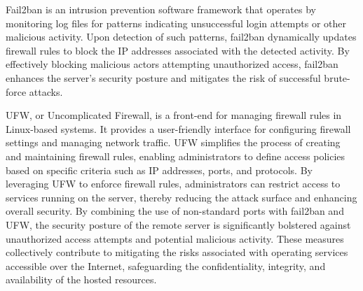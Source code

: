 \documentclass[12pt]{article} %
\begin{document}
\newline
\newline
\noindent Fail2ban is an intrusion prevention software framework that operates by monitoring log files for patterns indicating unsuccessful login attempts or other malicious activity. Upon detection of such patterns, fail2ban dynamically updates firewall rules to block the IP addresses associated with the detected activity. By effectively blocking malicious actors attempting unauthorized access, fail2ban enhances the server's security posture and mitigates the risk of successful brute-force attacks.
\newline
\newline

\pagebreak
\noindent UFW, or Uncomplicated Firewall, is a front-end for managing firewall rules in Linux-based systems. It provides a user-friendly interface for configuring firewall settings and managing network traffic. UFW simplifies the process of creating and maintaining firewall rules, enabling administrators to define access policies based on specific criteria such as IP addresses, ports, and protocols. By leveraging UFW to enforce firewall rules, administrators can restrict access to services running on the server, thereby reducing the attack surface and enhancing overall security.
\newline
\newline
\noindent By combining the use of non-standard ports with fail2ban and UFW, the security posture of the remote server is significantly bolstered against unauthorized access attempts and potential malicious activity. These measures collectively contribute to mitigating the risks associated with operating services accessible over the Internet, safeguarding the confidentiality, integrity, and availability of the hosted resources.
\end{document}
